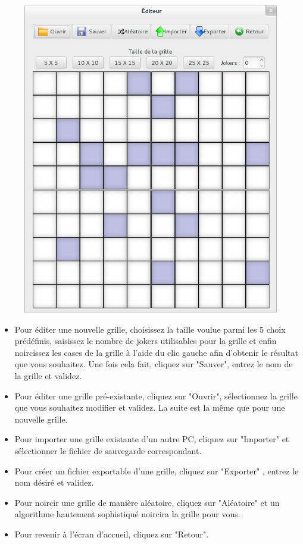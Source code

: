 \documentclass[a4paper, 12pt, twoside]{article}
\begin{document}
\begin{figure}[H]
  \center
  \includegraphics[scale=0.55]{editeur.png}

  \label{editeur}
\end{figure}

\begin{itemize}\setlength{\itemsep}{1mm}
 \item Pour éditer une nouvelle grille, choisissez la taille voulue parmi les 5 choix prédéfinis, saisissez le nombre de jokers utilisables pour la grille et enfin noircissez les cases de la grille à l'aide du clic gauche afin d'obtenir le résultat que vous souhaitez. Une fois cela fait, cliquez sur "Sauver", entrez le nom de la grille et validez.
 \item Pour éditer une grille pré-existante, cliquez sur "Ouvrir", sélectionnez la grille que vous souhaitez modifier et validez. La suite est la même que pour une nouvelle grille.
 \item Pour importer une grille existante d'un autre PC, cliquez sur "Importer" et sélectionner le fichier de sauvegarde correspondant.
  \item Pour créer un fichier exportable d'une grille, cliquez sur "Exporter" , entrez le nom désiré et validez.
 \item Pour noircir une grille de manière aléatoire, cliquez sur "Aléatoire" et un algorithme hautement sophistiqué noircira la grille pour vous.
 \item Pour revenir à l'écran d'accueil, cliquez sur "Retour".
\end{itemize}
\end{document}
